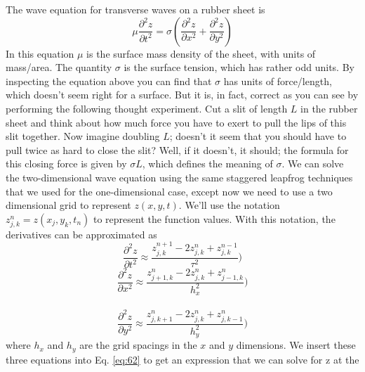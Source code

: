 The wave equation for transverse waves on a rubber sheet is
\begin{equation}\label{eq:62}
\mu \frac{\partial^2 z}{\partial t^2} = \sigma (\frac{\partial^2 z}{\partial x^2} + \frac{\partial^2 z}{\partial y^2} )
\end{equation}
In this equation $\mu$ is the surface mass density of the sheet, with units of mass/area.
The quantity $\sigma$ is the surface tension, which has rather odd units. By inspecting
the equation above you can find that $\sigma$ has units of force/length, which doesn\rq t
seem right for a surface. But it is, in fact, correct as you can see by performing the
following thought experiment. Cut a slit of length $L$ in the rubber sheet and think
about how much force you have to exert to pull the lips of this slit together. Now
imagine doubling $L$; doesn\rq t it seem that you should have to pull twice as hard to close the slit? Well, if it doesn\rq t, it should; the formula for this closing force is
given by $\sigma L$, which defines the meaning of $\sigma$.
We can solve the two-dimensional wave equation using the same staggered
leapfrog techniques that we used for the one-dimensional case, except now we
need to use a two dimensional grid to represent $z(x, y,t)$. We\rq ll use the notation $ z^n_{j,k} = z(x_j,y_k,t_n) $ to represent the function values. With this notation, the
derivatives can be approximated as
\begin{equation}\label{eq:63}
\frac{\partial^2 z}{\partial t^2} \approx \frac{z^{n+1}_{j,k}-2z^n_{j,k}+z^{n-1}_{j,k}}{\tau^2} )
\end{equation}
\begin{equation}\label{eq:64}
\frac{\partial^2 z}{\partial x^2} \approx \frac{z^{n}_{j+1,k}-2z^n_{j,k}+z^{n}_{j-1,k}}{h^2_x} )
\end{equation}\\
\begin{equation}\label{eq:65}
\frac{\partial^2 z}{\partial y^2} \approx \frac{z^{n}_{j,k+1}-2z^n_{j,k}+z^{n}_{j,k-1}}{h^2_y} )
\end{equation}
where $h_x$ and $h_y$ are the grid spacings in the $x$ and $y$ dimensions. We insert these
three equations into Eq. \eqref{eq:62} to get an expression that we can solve for z at the
